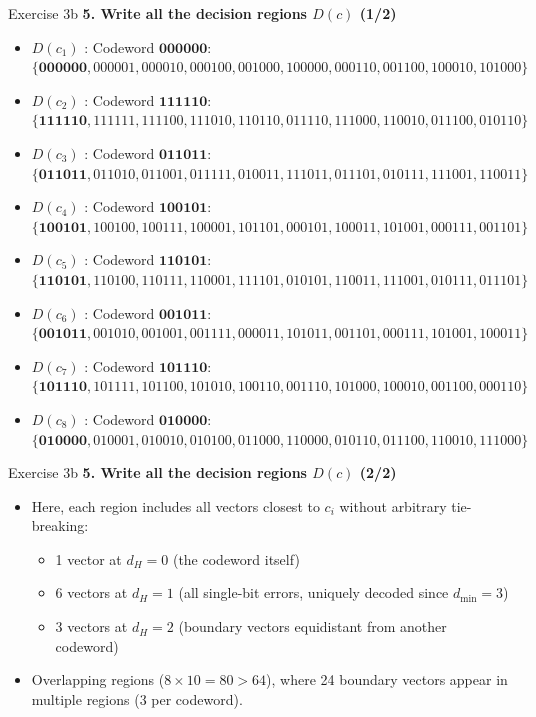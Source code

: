 \documentclass[10pt, aspectratio=169]{beamer}
\newcommand{\question}[1]{{\color{QuestionRed}\textbf{#1}}}
\begin{document}
\begin{frame}{Exercise 3b}
  \question{5. Write all the decision regions $D(c)$ (1/2)}

  \vspace{0.15cm}
  \footnotesize
  \begin{itemize}
    \item $D(c_1)$ : Codeword $\mathbf{000000}$: $\{\mathbf{000000}, 000001, 000010, 000100, 001000, 100000, 000110, 001100, 100010, 101000\}$
    \item $D(c_2)$ : Codeword $\mathbf{111110}$: $ \{\mathbf{111110}, 111111, 111100, 111010, 110110, 011110, 111000, 110010, 011100, 010110\}$
    \item $D(c_3)$ : Codeword $\mathbf{011011}$: $ \{\mathbf{011011}, 011010, 011001, 011111, 010011, 111011, 011101, 010111, 111001, 110011\}$
    \item $D(c_4)$ : Codeword $\mathbf{100101}$: $\{\mathbf{100101}, 100100, 100111, 100001, 101101, 000101, 100011, 101001, 000111, 001101\}$
    \item $D(c_5)$ : Codeword $\mathbf{110101}$: $\{\mathbf{110101}, 110100, 110111, 110001, 111101, 010101, 110011, 111001, 010111, 011101\}$
    \item $D(c_6)$ : Codeword $\mathbf{001011}$: $\{\mathbf{001011}, 001010, 001001, 001111, 000011, 101011, 001101, 000111, 101001, 100011\}$
    \item $D(c_7)$ : Codeword $\mathbf{101110}$: $\{\mathbf{101110}, 101111, 101100, 101010, 100110, 001110, 101000, 100010, 001100, 000110\}$
    \item $D(c_8)$ : Codeword $\mathbf{010000}$: $\{\mathbf{010000}, 010001, 010010, 010100, 011000, 110000, 010110, 011100, 110010, 111000\}$
  \end{itemize}
\end{frame}

\begin{frame}{Exercise 3b}
  \question{5. Write all the decision regions $D(c)$ (2/2)}

  \vspace{0.25cm}
  \begin{itemize}
    \item Here, each region includes all vectors closest to $c_i$ without arbitrary tie-breaking:
    \begin{itemize}
      \item 1 vector at $d_H = 0$ (the codeword itself)
      \item 6 vectors at $d_H = 1$ (all single-bit errors, uniquely decoded since $d_{\min} = 3$)
      \item 3 vectors at $d_H = 2$ (boundary vectors equidistant from another codeword)
    \end{itemize}
    \item Overlapping regions ($8 \times 10 = 80 > 64$), where 24 boundary vectors appear in multiple regions (3 per codeword).
  \end{itemize}
\end{frame}
\end{document}
